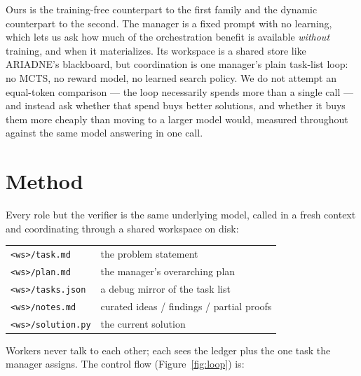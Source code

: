 \documentclass{article}
\begin{document}
Ours is the training-free counterpart to the first family and the dynamic counterpart to the
second. The manager is a fixed prompt with no learning, which lets us ask how much of the
orchestration benefit is available \emph{without} training, and when it materializes. Its
workspace is a shared store like ARIADNE's blackboard, but coordination is one manager's
plain task-list loop: no MCTS, no reward model, no learned search policy. We do not attempt
an equal-token comparison --- the loop necessarily spends more than a single call --- and
instead ask whether that spend buys better solutions, and whether it buys them more cheaply
than moving to a larger model would, measured throughout against the same model answering in
one call.

\section{Method}
\label{sec:method}

Every role but the verifier is the same underlying model, called in a fresh context and
coordinating through a shared workspace on disk:

\begin{center}
\small
\begin{tabular}{@{}ll@{}}
\texttt{<ws>/task.md}     & the problem statement \\
\texttt{<ws>/plan.md}     & the manager's overarching plan \\
\texttt{<ws>/tasks.json}  & a debug mirror of the task list \\
\texttt{<ws>/notes.md}    & curated ideas / findings / partial proofs \\
\texttt{<ws>/solution.py} & the current solution \\
\end{tabular}
\end{center}

Workers never talk to each other; each sees the ledger plus the one task the manager
assigns. The control flow (Figure~\ref{fig:loop}) is:
\end{document}
